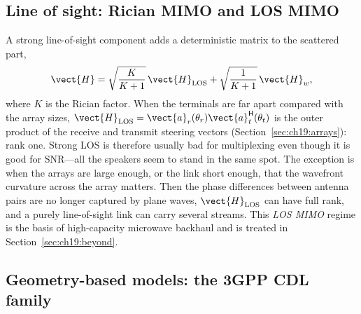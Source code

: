 \subsection{Line of sight: Rician MIMO and LOS MIMO}

A strong line-of-sight component adds a deterministic matrix to the scattered part,
\begin{equation}
\vect{H}=\sqrt{\frac{K}{K+1}}\,\vect{H}_{\text{LOS}}+\sqrt{\frac{1}{K+1}}\,\vect{H}_w,
\end{equation}
where $K$ is the Rician factor. When the terminals are far apart compared with the array sizes,
$\vect{H}_{\text{LOS}}=\vect{a}_r(\theta_r)\vect{a}_t^{\mathsf H}(\theta_t)$ is the outer product of
the receive and transmit steering vectors (Section~\ref{sec:ch19:arrays}): rank one. Strong LOS is
therefore usually bad for multiplexing even though it is good for SNR---all the speakers seem to
stand in the same spot. The exception is when the arrays are large enough, or the link short
enough, that the wavefront curvature across the array matters. Then the phase differences between
antenna pairs are no longer captured by plane waves, $\vect{H}_{\text{LOS}}$ can have full rank,
and a purely line-of-sight link can carry several streams. This \emph{LOS MIMO} regime is the basis
of high-capacity microwave backhaul and is treated in Section~\ref{sec:ch19:beyond}.


\subsection{Geometry-based models: the 3GPP CDL family}

